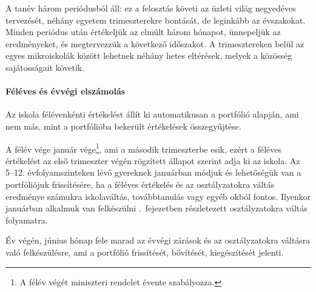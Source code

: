 A tanév három periódusból áll: ez a felosztás követi az üzleti világ negyedéves tervezését, néhány egyetem trimeszterekre bontását, de leginkább az évszakokat. Minden periódus után értékeljük az elmúlt három hónapot, ünnepeljük az eredményeket, és megtervezzük a következő időszakot.  A trimesztereken belül az egyes mikroiskolák között lehetnek néhány hetes eltérések, melyek a közösség sajátosságait követik.

\paragraph{Féléves és évvégi elszámolás}
\label{sec:feleves_bontas}
Az iskola félévenkénti értékelést állít ki automatikusan a portfólió alapján, ami nem más, mint a portfólióba bekerült értékelések összegyűjtése.

A félév vége január vége\footnote{A félév végét miniszteri rendelet évente szabályozza.}, ami a második trimeszterbe esik, ezért a féléves értékelést az első trimeszter végén rögzített állapot szerint adja ki az iskola.  Az 5--12. évfolyamszinteken lévő gyereknek januárban módjuk és lehetőségük van a portfóliójuk frissítésére, ha a féléves értékelés és az osztályzatokra váltás eredménye számukra iskolaváltás, továbbtanulás vagy egyéb okból fontos. Ilyenkor januárban alkalmuk van felkészülni .~fejezetben részletezett osztályzatokra váltás folyamatra.

Év végén, június hónap fele marad az évvégi zárások és az osztályzatokra váltásra való felkészülésre, ami a portfólió frissítését, bővítését, kiegészítését jelenti.